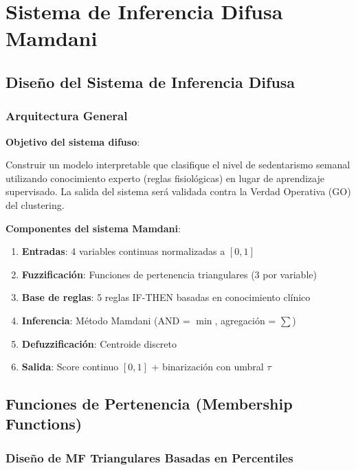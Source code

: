 \documentclass[12pt,letterpaper,twoside]{report}
\begin{document}
\chapter{Sistema de Inferencia Difusa Mamdani}

\section{Diseño del Sistema de Inferencia Difusa}

\subsection{Arquitectura General}

\begin{hipotesisbox}
\textbf{Objetivo del sistema difuso}:

Construir un modelo interpretable que clasifique el nivel de sedentarismo semanal utilizando conocimiento experto (reglas fisiológicas) en lugar de aprendizaje supervisado. La salida del sistema será validada contra la Verdad Operativa (GO) del clustering.
\end{hipotesisbox}

\begin{estadisticobox}
\textbf{Componentes del sistema Mamdani}:

\begin{enumerate}[noitemsep]
    \item \textbf{Entradas}: 4 variables continuas normalizadas a $[0,1]$
    \item \textbf{Fuzzificación}: Funciones de pertenencia triangulares (3 por variable)
    \item \textbf{Base de reglas}: 5 reglas IF-THEN basadas en conocimiento clínico
    \item \textbf{Inferencia}: Método Mamdani (AND = $\min$, agregación = $\sum$)
    \item \textbf{Defuzzificación}: Centroide discreto
    \item \textbf{Salida}: Score continuo $[0,1]$ + binarización con umbral $\tau$
\end{enumerate}
\end{estadisticobox}

\section{Funciones de Pertenencia (Membership Functions)}

\subsection{Diseño de MF Triangulares Basadas en Percentiles}
\end{document}
